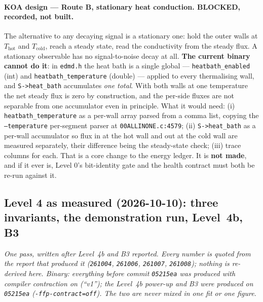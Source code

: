 \documentclass[11pt,a4paper]{article}
\begin{document}
\paragraph{KOA design --- Route B, stationary heat conduction. BLOCKED, recorded, not built.} The
alternative to any decaying signal is a stationary one: hold the outer walls at $T_{\mathrm{hot}}$
and $T_{\mathrm{cold}}$, reach a steady state, read the conductivity from the steady flux. A
stationary observable has no signal-to-noise decay at all. \textbf{The current binary cannot do
it}: in \texttt{edmd.h} the heat bath is a single global --- \texttt{heatbath\_enabled} (int) and
\texttt{heatbath\_temperature} (double) --- applied to every thermalising wall, and
\texttt{S->heat\_bath} accumulates \emph{one total}. With both walls at one temperature the net
steady flux is zero by construction, and the per-side fluxes are not separable from one accumulator
even in principle. What it would need: (i) \texttt{heatbath\_temperature} as a per-wall array parsed
from a comma list, copying the \texttt{--temperature} per-segment parser at
\texttt{00ALLINONE.c:4579}; (ii) \texttt{S->heat\_bath} as a per-wall accumulator so flux in at the
hot wall and out at the cold wall are measured separately, their difference being the steady-state
check; (iii) trace columns for each. That is a core change to the energy ledger. It is \textbf{not
made}, and if it ever is, Level 0's bit-identity gate and the health contract must both be re-run
against it.

\subsection{Level 4 as measured (2026-10-10): three invariants, the demonstration run, Level~4b, B3}
\label{sec:l4measured}

\emph{One pass, written after Level~4b and B3 reported. Every number is quoted from the report that
produced it (\texttt{261004}, \texttt{261006}, \texttt{261007}, \texttt{261008}); nothing is
re-derived here. Binary: everything before commit \texttt{05215ea} was produced with compiler
contraction on (``v1''); the Level~4b power-up and B3 were produced on \texttt{05215ea}
(\texttt{-ffp-contract=off}). The two are never mixed in one fit or one figure.}
\end{document}

